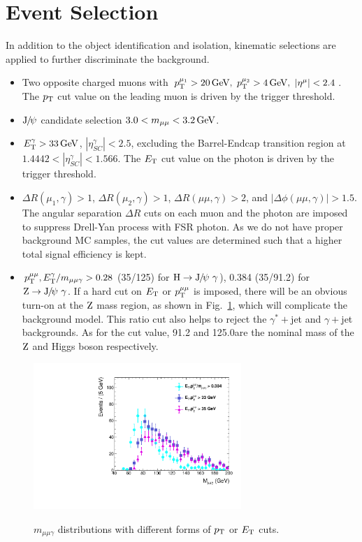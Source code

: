 		\section{Event Selection}  
		\label{subsec:KS}
		In addition to the object identification and isolation, kinematic selections are applied to further discriminate the background.
		\begin{itemize}
		\item Two opposite charged muons with $p_{\mathrm{T}}^{\mu_{1}} > 20\,\text{Ge\hspace{-.08em}V},\ p_{\mathrm{T}}^{\mu_{2}} > 4\,\text{Ge\hspace{-.08em}V},\ \left|\eta^{\mu}\right| < 2.4$. The $p_{\mathrm{T}}$ cut value on the leading muon is driven by the trigger threshold. 
		\item ${\mathrm{J}\hspace{-.08em}/\hspace{-.14em}\psi}$ candidate selection $3.0 < m_{\mu\mu} < 3.2\,\text{Ge\hspace{-.08em}V}$.
		\item $E_{\mathrm{T}}^{\gamma} > 33\,\text{Ge\hspace{-.08em}V}$, $\left|\eta_{SC}^{\gamma}\right| < 2.5$, excluding the Barrel-Endcap transition region at $1.4442 < \left|\eta_{SC}^{\gamma}\right| < 1.566$. The $E_{\mathrm{T}}$ cut value on the photon is driven by the trigger threshold.
		\item $\Delta R(\mu_{1},\gamma) > 1$, $\Delta R(\mu_{2},\gamma) > 1$, $\Delta R(\mu\mu,\gamma) > 2$, and $|\Delta\phi(\mu\mu,\gamma)| > 1.5$. The angular separation $\Delta R$ cuts on each muon and the photon are imposed to suppress Drell-Yan process with FSR photon. As we do not have proper background MC samples, the cut values are determined such that a higher total signal efficiency is kept.  
		\item $p_{\mathrm{T}}^{\mu\mu},E_{\mathrm{T}}^{\gamma} / m_{\mu\mu\gamma} > 0.28$ (35/125) for $\mathrm{H}\to{\mathrm{J}\hspace{-.08em}/\hspace{-.14em}\psi}\ \gamma$), 0.384 (35/91.2) for $\mathrm{Z}\to{\mathrm{J}\hspace{-.08em}/\hspace{-.14em}\psi}\ \gamma$. If a hard cut on $E_{\mathrm{T}}$ or $p_{\mathrm{T}}^{\mu\mu}$ is imposed, there will be an obvious turn-on at the $\mathrm{Z}$ mass region, as shown in Fig.~\ref{fig:invariantmass}, which will complicate the background model. This ratio cut also helps to reject the $\gamma^*+$jet and $\gamma+$jet backgrounds. As for the cut value, 91.2 and 125.0\GeV are the nominal mass of the $\mathrm{Z}$ and Higgs boson respectively.
		\end{itemize}
		
		\begin{figure}[!ht]
		  \centering
		  \includegraphics[width=0.7\textwidth]{Fig/Mmmg_Various}\\
		  \caption{$m_{\mu\mu\gamma}$ distributions with different forms of $p_{\mathrm{T}}$ or $E_{\mathrm{T}}$ cuts. \label{fig:invariantmass}}
		\end{figure}
		

